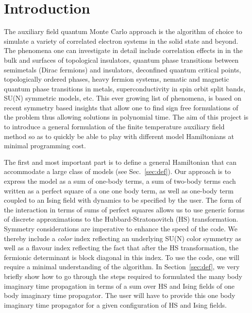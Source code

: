\section{Introduction}\label{sec:intro}

The auxiliary field quantum Monte Carlo approach is the algorithm of choice to simulate a variety of correlated electron systems in the solid state and beyond.  The phenomena  one can investigate in detail include correlation effects in in the bulk and surfaces of topological insulators, quantum phase transitions between semimetals (Dirac fermions)  and insulators,  deconfined quantum critical points, topologically ordered phases, heavy fermion systems, nematic and magnetic quantum phase transitions in metals,   superconductivity in spin orbit split bands, SU(N) symmetric models,  etc.  This ever growing list of phenomena,  is based on  recent symmetry based insights that allow one to  find  sign free formulations of the  problem thus allowing solutions in polynomial time.    The aim of this project is to introduce a general formulation of the finite temperature  auxiliary field method  so as to quickly be able to play with different model Hamiltonians  at  minimal programming cost.  
	
		The first and most important  part is to define a general Hamiltonian  that  can  accommodate a large class of models  (see Sec.~\ref{sec:def}). Our approach is to express the model as a sum of one-body terms, a sum of two-body terms each written as a perfect square of a one one body term, as well as one-body  term  coupled to an Ising field with  dynamics to be specified by the user.   
The form of the interaction in terms of sums of perfect squares allows us to use generic forms of  discrete  approximations to the  Hubbard-Stratonovitch (HS)  transformation. 	 Symmetry considerations  are  imperative to enhance the speed of the code.   We thereby include a {\it color} index  reflecting  an underlying  SU(N) color symmetry as  well as a flavour index  reflecting  the fact that  after  the HS  transformation,  the  fermionic determinant is block diagonal in this index.    To use the code, one will require a minimal understanding of the algorithm.  In Section~\ref{sec:def}, we very briefly show how to go through  the steps required  to formulated the many body imaginary time propagation in terms of a sum  over HS and Ising fields  of one body  imaginary time propagator.   The user will have to provide this one body imaginary time propagator for a given configuration of   HS and  Ising fields.   
	  
